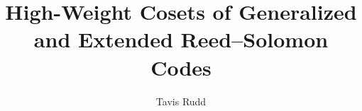 \documentclass[10pt,journal,onecolumn]{IEEEtran}
\title{High-Weight Cosets of Generalized and Extended Reed--Solomon Codes}
\author{Tavis Rudd}
\theoremstyle{upright}
\theoremstyle{definition}
\theoremstyle{remark}
\begin{document}
\raggedbottom
\maketitle

\begin{abstract}

\end{abstract}

\begin{IEEEkeywords}

\end{IEEEkeywords}











\appendices





\end{document}
